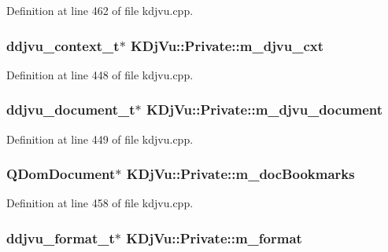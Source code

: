 Definition at line 462 of file kdjvu.\+cpp.

\hypertarget{classKDjVu_1_1Private_a5a52150a7ab9bbd584d6d73d68ae9ba1}{
\subsubsection[{m\+\_\+djvu\+\_\+cxt}]{\setlength{\rightskip}{0pt plus 5cm}ddjvu\+\_\+context\+\_\+t$\ast$ K\+Dj\+Vu\+::\+Private\+::m\+\_\+djvu\+\_\+cxt}}\label{classKDjVu_1_1Private_a5a52150a7ab9bbd584d6d73d68ae9ba1}


Definition at line 448 of file kdjvu.\+cpp.

\hypertarget{classKDjVu_1_1Private_a183f9508738c71bb5abab150619a5ccd}{
\subsubsection[{m\+\_\+djvu\+\_\+document}]{\setlength{\rightskip}{0pt plus 5cm}ddjvu\+\_\+document\+\_\+t$\ast$ K\+Dj\+Vu\+::\+Private\+::m\+\_\+djvu\+\_\+document}}\label{classKDjVu_1_1Private_a183f9508738c71bb5abab150619a5ccd}


Definition at line 449 of file kdjvu.\+cpp.

\hypertarget{classKDjVu_1_1Private_a44dd323816fabcc89971ce3d0b9b72a7}{
\subsubsection[{m\+\_\+doc\+Bookmarks}]{\setlength{\rightskip}{0pt plus 5cm}Q\+Dom\+Document$\ast$ K\+Dj\+Vu\+::\+Private\+::m\+\_\+doc\+Bookmarks}}\label{classKDjVu_1_1Private_a44dd323816fabcc89971ce3d0b9b72a7}


Definition at line 458 of file kdjvu.\+cpp.

\hypertarget{classKDjVu_1_1Private_aad4bfbe2fe3646d6c9f862e6575c00cb}{
\subsubsection[{m\+\_\+format}]{\setlength{\rightskip}{0pt plus 5cm}ddjvu\+\_\+format\+\_\+t$\ast$ K\+Dj\+Vu\+::\+Private\+::m\+\_\+format}}\label{classKDjVu_1_1Private_aad4bfbe2fe3646d6c9f862e6575c00cb}


